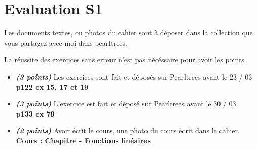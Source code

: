 \documentclass[11pt]{article}
\newcommand{\tempsexo}[1]{\textit{\textbf{(#1)}}}
\begin{document}
\newpage
\section{Evaluation S1 }

Les documents textes, ou photos du cahier sont à déposer dans la collection que vous partagez avec moi dans pearltrees.

La réussite des exercices sans erreur n'est pas nécéssaire pour avoir les points.

	\begin{itemize} 
	  \item \tempsexo{3 points} Les exercices sont fait et déposés sur Pearltrees avant le 23 / 03 \\	
    \textbf{p122 ex 15, 17 et 19}
	
	  \item \tempsexo{3 points} L'exercice est fait et déposé sur Pearltrees avant le 30 / 03 \\
	\textbf{p133 ex 79}

	  \item \tempsexo{2 points} Avoir écrit le cours, une photo du cours écrit dans le cahier.
		\textbf{Cours : Chapitre - Fonctions linéaires}
\end{itemize}	
\end{document}
